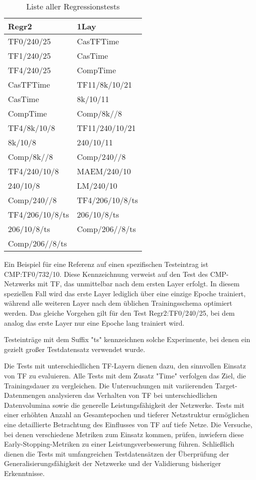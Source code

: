\begin{table}[!ht]
    \centering
    \begin{tabular}{l|l}
        \textbf{Regr2} & \textbf{1Lay} \\
        \hline
        TF0/240/25 & CasTFTime \\
        TF1/240/25 & CasTime \\
        TF4/240/25 & CompTime \\
        CasTFTime & TF11/8k/10/21 \\
        CasTime & 8k/10/11 \\
        CompTime & Comp/8k//8 \\
        TF4/8k/10/8 & TF11/240/10/21 \\
        8k/10/8 & 240/10/11 \\
        Comp/8k//8 & Comp/240//8 \\
        TF4/240/10/8 & MAEM/240/10 \\
        240/10/8 & LM/240/10 \\
        Comp/240//8 & TF4/206/10/8/ts \\
        TF4/206/10/8/ts & 206/10/8/ts \\
        206/10/8/ts & Comp/206//8/ts \\
        Comp/206//8/ts &
    \end{tabular}
    \caption{\label{tab:regrtests} Liste aller Regressionstests}
\end{table}

Ein Beispiel für eine Referenz auf einen spezifischen Testeintrag ist CMP:TF0/732/10. Diese Kennzeichnung verweist auf den Test des 
CMP-Netzwerks mit TF, das unmittelbar nach dem ersten Layer erfolgt. In diesem speziellen Fall wird das erste Layer 
lediglich über eine einzige Epoche trainiert, während alle weiteren Layer nach dem üblichen Trainingsschema optimiert werden. Das gleiche 
Vorgehen gilt für den Test Regr2:TF0/240/25, bei dem analog das erste Layer nur eine Epoche lang trainiert wird.

Testeinträge mit dem Suffix "ts" kennzeichnen solche Experimente, bei denen ein gezielt großer Testdatensatz verwendet wurde.

Die Tests mit unterschiedlichen TF-Layern dienen dazu, den sinnvollen Einsatz von TF zu evaluieren. Alle Tests mit dem Zusatz "Time" verfolgen 
das Ziel, die Trainingsdauer zu vergleichen. Die Untersuchungen mit variierenden Target-Datenmengen analysieren das Verhalten 
von TF bei unterschiedlichen Datenvolumina sowie die generelle Leistungsfähigkeit der Netzwerke. Tests mit einer erhöhten Anzahl an 
Gesamtepochen und tieferer Netzstruktur ermöglichen eine detaillierte Betrachtung des Einflusses von TF auf tiefe Netze. Die Versuche, bei denen 
verschiedene Metriken zum Einsatz kommen, prüfen, inwiefern diese Early-Stopping-Metriken zu einer Leistungsverbesserung führen. Schließlich 
dienen die Tests mit umfangreichen Testdatensätzen der Überprüfung der Generalisierungsfähigkeit der Netzwerke und der Validierung bisheriger 
Erkenntnisse.
